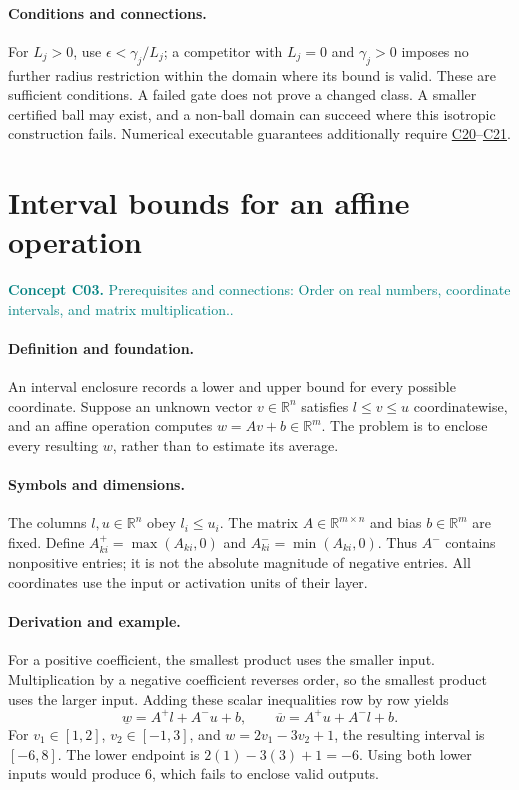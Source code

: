 \documentclass[11pt,a4paper]{article}
\newcommand{\R}{\mathbb R}
\newcommand{\conceptid}{Front matter}
\newcommand{\concept}[3]{\clearpage\renewcommand{\conceptid}{#1}%
\section{#2}\label{concept:#1}%
\textcolor{teal}{\textbf{Concept #1.} Prerequisites and connections: #3.}\par
\typeout{ECDR-CONCEPT-START #1 PAGE=\thepage}}
\begin{document}
\paragraph{Conditions and connections.}
For $L_j>0$, use $\epsilon<\gamma_j/L_j$; a competitor with $L_j=0$ and $\gamma_j>0$ imposes no further radius restriction within the domain where its bound is valid. These are sufficient conditions. A failed gate does not prove a changed class. A smaller certified ball may exist, and a non-ball domain can succeed where this isotropic construction fails. Numerical executable guarantees additionally require \hyperref[concept:C20]{C20}--\hyperref[concept:C21]{C21}.
\par\label{endconcept:C02}

\concept{C03}{Interval bounds for an affine operation}{Order on real numbers, coordinate intervals, and matrix multiplication.}
\paragraph{Definition and foundation.}
An interval enclosure records a lower and upper bound for every possible coordinate. Suppose an unknown vector $v\in\R^n$ satisfies $l\le v\le u$ coordinatewise, and an affine operation computes $w=Av+b\in\R^m$. The problem is to enclose every resulting $w$, rather than to estimate its average.
\paragraph{Symbols and dimensions.}
The columns $l,u\in\R^n$ obey $l_i\le u_i$. The matrix $A\in\R^{m\times n}$ and bias $b\in\R^m$ are fixed. Define $A^+_{ki}=\max(A_{ki},0)$ and $A^-_{ki}=\min(A_{ki},0)$. Thus $A^-$ contains nonpositive entries; it is not the absolute magnitude of negative entries. All coordinates use the input or activation units of their layer.
\paragraph{Derivation and example.}
For a positive coefficient, the smallest product uses the smaller input. Multiplication by a negative coefficient reverses order, so the smallest product uses the larger input. Adding these scalar inequalities row by row yields
\[
 \underline w=A^+l+A^-u+b,\qquad
 \overline w=A^+u+A^-l+b.
\]
For $v_1\in[1,2]$, $v_2\in[-1,3]$, and $w=2v_1-3v_2+1$, the resulting interval is $[-6,8]$. The lower endpoint is $2(1)-3(3)+1=-6$. Using both lower inputs would produce 6, which fails to enclose valid outputs.
\end{document}
